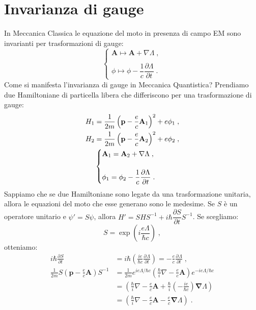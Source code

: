 \documentclass[12pt,a4paper]{report}
\theoremstyle{definition}
\newcommand{\pdev}[3][]{\frac{\partial^{#1} #2}{\partial #3^{#1}}}
\numberwithin{equation}{section}
\newcommand{\bnabla}{\boldsymbol{\nabla}}
\begin{document}
\section{Invarianza di gauge}
In Meccanica Classica le equazione del moto in presenza di campo EM sono invarianti per trasformazioni di gauge:
\begin{equation}
\begin{cases}
\mathbf{A}\longmapsto \mathbf{A}+\nabla\Lambda\;, \\
\\
\phi\longmapsto \phi-\dfrac{1}{c}\dfrac{\partial\Lambda}{\partial t}\;.
\end{cases}
\end{equation}
Come si manifesta l'invarianza di gauge in Meccanica Quantistica? Prendiamo due Hamiltoniane di particella libera che differiscono per una trasformazione di gauge:
\begin{align}
H_1 &= \frac{1}{2m}\left(\mathbf{p}-\frac{e}{c}\mathbf{A}_1\right)^2+e\phi_1 \notag \;,\\
H_2 &= \frac{1}{2m}\left(\mathbf{p}-\frac{e}{c}\mathbf{A}_2\right)^2+e\phi_2 \notag\;, \\
&\begin{cases}
\mathbf{A}_1=\mathbf{A}_2+\nabla\Lambda\;, \\
\\
\phi_1=\phi_2-\dfrac{1}{c}\dfrac{\partial\Lambda}{\partial t}\;.
\end{cases}
\end{align}
Sappiamo che se due Hamiltoniane sono legate da una trasformazione unitaria, allora le equazioni del moto che esse generano sono le medesime. Se $S$ è un operatore unitario e $\psi'=S\psi$, allora $H'=SHS^{-1}+i\hbar\dfrac{\partial S}{\partial t}S^{-1}$. Se scegliamo:
\begin{equation}
S=\exp\left(i\frac{e\Lambda}{\hbar c}\right)\;,
\end{equation}
otteniamo:
\begin{align*}
i\hbar\pdev{S}{t}&= i\hbar\left(\frac{ie}{\hbar c}\pdev{\Lambda}{t}\right)=-\frac{e}{c}\pdev{\Lambda}{t}\;, \\
\frac{1}{2m}S\left(\mathbf{p}-\frac{e}{c}\mathbf{A}\right)S^{-1}&=\frac{1}{2m}e^{ie\Lambda/\hbar c}\left(\frac{\hbar}{i}\nabla-\frac{e}{c}\mathbf{A}\right)e^{-ie\Lambda/\hbar c} \\
&=\left(\frac{\hbar}{i}\nabla-\frac{e}{c}\mathbf{A}+\frac{\hbar}{i}\left(-\frac{ie}{\hbar c}\right)\bnabla\Lambda\right) \\
&=\left(\frac{\hbar}{i}\nabla-\frac{e}{c}\mathbf{A}-\frac{e}{c}\bnabla\Lambda\right)\;.
\end{align*}
\end{document}
